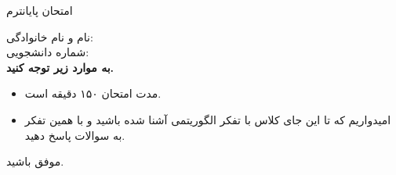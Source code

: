 
\usepackage{template/template}
\usepackage{tabularx}
\usepackage{graphicx}
\graphicspath{ {./images/} }


	\def\ci{\perp\!\!\!\perp}

	

	\header
		{امتحان پایانترم}{}{}{}{}
	


		نام و نام خانوادگی:\\
		شماره دانشجویی:\\
		\textbf{به موارد زیر توجه کنید.}
		
		\begin{itemize}
			\item مدت امتحان ۱۵۰ دقیقه است.
			\item امیدواریم که تا این جای کلاس با تفکر الگوریتمی آشنا شده باشید و با همین تفکر به سوالات پاسخ دهید.
		\end{itemize}
		
	\begin{enumerate}
		\setlength{\itemsep}{30pt}

		\end{enumerate}
	\begin{flushleft}
			موفق باشید. 
	\end{flushleft}

